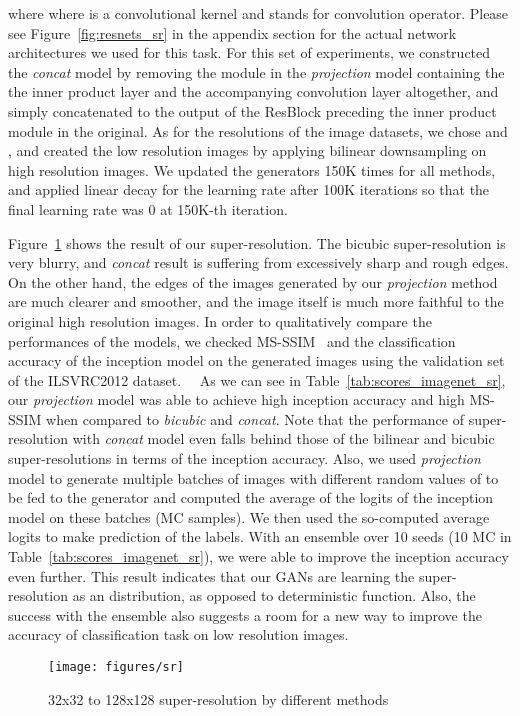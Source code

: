 \documentclass{article}
\begin{document}
where  where  is a convolutional kernel and  stands for convolution operator. 
Please see Figure~\ref{fig:resnets_sr} in the appendix section for the actual network architectures we used for this task.
For this set of experiments, we constructed the \textit{concat} model by removing the module in the \textit{projection} model containing the the inner product layer and the accompanying convolution layer altogether,  and simply concatenated  to the output of the ResBlock preceding the inner product module in the original.
As for the resolutions of the image datasets, we chose  and , and created the low resolution images by applying bilinear downsampling on high resolution images.  
We updated the generators 150K times for all methods, and applied linear decay for the learning rate after 100K iterations so that the final learning rate was 0 at 150K-th iteration.

Figure~\ref{fig:sr} shows the result of our super-resolution.
The bicubic super-resolution is very blurry, and \textit{concat} result is suffering from excessively sharp and rough edges. 
On the other hand, the edges of the images generated by our \textit{projection} method are much clearer and  smoother,  and the image itself is much more faithful to the original high resolution images. 
In order to qualitatively compare the performances of the models, we checked MS-SSIM~\cite[]{wang2003multiscale} and the classification accuracy of the inception model on the generated images using the validation set of the ILSVRC2012 dataset. 　As we can see in Table~\ref{tab:scores_imagenet_sr}, our \textit{projection} model was able to achieve high inception accuracy and high MS-SSIM when compared to \textit{bicubic} and \textit{concat}.
Note that the performance of super-resolution with \textit{concat} model even falls behind those of the bilinear and bicubic super-resolutions in terms of the inception accuracy. Also, we used \textit{projection} model to generate multiple batches of images with different random values of  to be fed to the generator and computed the average of the logits of the inception model on these batches (MC samples). We then used the so-computed average logits to make prediction of the labels. 
With an ensemble over 10 seeds (10 MC in Table~\ref{tab:scores_imagenet_sr}), we were able to improve the inception accuracy even further.  
This result indicates that our GANs are learning the super-resolution as an distribution, as opposed to deterministic function.
Also, the success with the ensemble also suggests a room for a new way to improve the accuracy of classification task on low resolution images. 
\begin{figure}[t]
    \centering
	\texttt{[image: figures/sr]}
    \caption{\label{fig:sr}32x32 to 128x128 super-resolution by different methods}
\end{figure}
\end{document}
